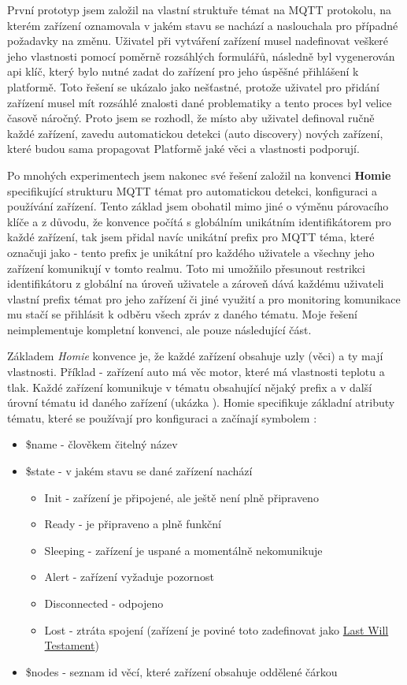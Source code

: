 První prototyp jsem založil na vlastní struktuře témat na MQTT protokolu, na kterém zařízení oznamovala v jakém stavu se nachází a naslouchala pro případné požadavky na změnu. Uživatel při vytváření zařízení musel nadefinovat veškeré jeho vlastnosti pomocí poměrně rozsáhlých formulářů, následně byl vygenerován api klíč, který bylo nutné zadat do zařízení pro jeho úspěšné přihlášení k platformě. Toto řešení se ukázalo jako nešťastné, protože uživatel pro přidání zařízení musel mít rozsáhlé znalosti dané problematiky a tento proces byl velice časově náročný. Proto jsem se rozhodl, že místo aby uživatel definoval ručně každé zařízení, zavedu automatickou detekci (auto discovery) nových zařízení, které budou sama propagovat Platformě jaké věci a vlastnosti podporují.

Po mnohých experimentech jsem nakonec své řešení založil na konvenci \textbf{Homie} \cite{homie} specifikující strukturu MQTT témat pro automatickou detekci, konfiguraci a používání zařízení. Tento základ jsem obohatil mimo jiné o výměnu párovacího klíče a z důvodu, že konvence počítá s globálním unikátním identifikátorem pro každé zařízení, tak jsem přidal navíc unikátní prefix pro MQTT téma, které označuji jako  - tento prefix je unikátní pro každého uživatele a všechny jeho zařízení komunikují v tomto realmu. Toto mi umožňilo přesunout restrikci identifikátoru z globální na úroveň uživatele a zároveň dává každému uživateli vlastní prefix témat pro jeho zařízení či jiné využití a pro monitoring komunikace mu stačí se přihlásit k odběru všech zpráv z daného tématu. Moje řešení neimplementuje kompletní konvenci, ale pouze následující část.

Základem \textit{Homie} konvence je, že každé zařízení obsahuje uzly (věci) a ty mají vlastnosti. Příklad - zařízení auto má věc motor, které má vlastnosti teplotu a tlak. Každé zařízení komunikuje v tématu obsahující nějaký prefix a v další úrovní tématu id daného zařízení (ukázka ). Homie specifikuje základní atributy tématu, které se používají pro konfiguraci a začínají symbolem \uv{\$}:
\begin{itemize}
    \item \$name - člověkem čitelný název
    \item \$state - v jakém stavu se dané zařízení nachází
          \begin{itemize}
              \item  Init - zařízení je připojené, ale ještě není plně připraveno
              \item Ready - je připraveno a plně funkční
              \item Sleeping - zařízení je uspané a momentálně nekomunikuje
              \item  Alert - zařízení vyžaduje pozornost
              \item Disconnected - odpojeno
              \item Lost - ztráta spojení (zařízení je poviné toto zadefinovat jako \hyperlink{LWT}{Last Will Testament})
          \end{itemize}
    \item \$nodes - seznam id věcí, které zařízení obsahuje oddělené čárkou
\end{itemize}


